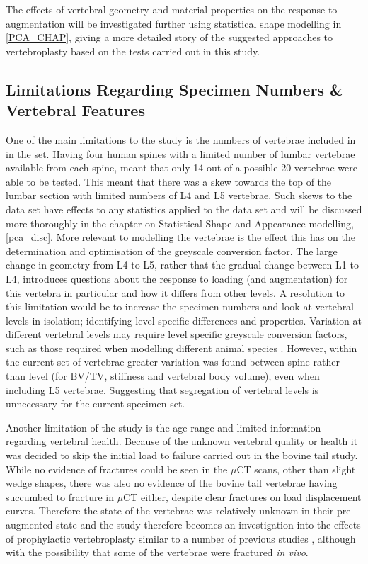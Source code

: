 The effects of vertebral geometry and material properties on the response to
augmentation will be investigated further using statistical shape modelling in
\cref{PCA_CHAP}, giving a more detailed story of the suggested approaches to
vertebroplasty based on the tests carried out in this study.

\subsection{Limitations Regarding Specimen Numbers \& Vertebral Features}

One of the main limitations to the study is the numbers of vertebrae included
in in the set.  Having four human spines with a limited number of lumbar
vertebrae available from each spine, meant that only 14 out of a possible 20
vertebrae were able to be tested.  This meant that there was a skew towards the
top of the lumbar section with limited numbers of L4 and L5 vertebrae.  Such
skews to the data set have effects to any statistics applied to the data set
and will be discussed more thoroughly in the chapter on Statistical Shape and
Appearance modelling, \cref{pca_disc}.  More relevant to modelling the
vertebrae is the effect this has on the determination and optimisation of the
greyscale conversion factor.  The large change in geometry from L4 to L5,
rather that the gradual change between L1 to L4, introduces questions about the
response to loading (and augmentation) for this vertebra in particular and how
it differs from other levels.  A resolution to this limitation would be to
increase the specimen numbers and look at vertebral levels in isolation;
identifying level specific differences and properties.  Variation at different
vertebral levels may require level specific greyscale conversion factors, such
as those required when modelling different animal species
\cite{zapata2017methodology}.  However, within the current set of vertebrae
greater variation was found between spine rather than level (for BV/TV,
stiffness and vertebral body volume), even when including L5 vertebrae.
Suggesting that segregation of vertebral levels is unnecessary for the current
specimen set. %

Another limitation of the study is the age range and limited information
regarding vertebral health.  Because of the unknown vertebral quality or health
it was decided to skip the initial load to failure carried out in the bovine
tail study.  While no evidence of fractures could be seen in the $\mu$CT scans,
other than slight wedge shapes, there was also no evidence of the bovine tail
vertebrae having succumbed to fracture in $\mu$CT either, despite clear
fractures on load displacement curves.  Therefore the state of the vertebrae
was relatively unknown in their pre-augmented state and the study therefore
becomes an investigation into the effects of prophylactic vertebroplasty
similar to a number of previous studies
\cite{higgins2003biomechanical,furtado2007biomechanical,oakland2009preliminary},
although with the possibility that some of the vertebrae were fractured
\textit{in vivo}. 


